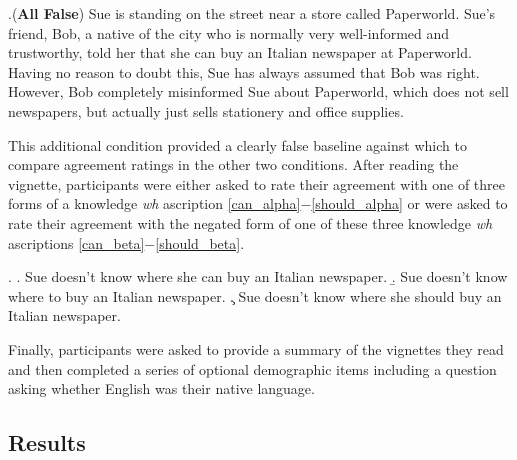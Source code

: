 \documentclass[a4paper]{article}
\begin{document}
\ex.\label{bobreallywrong}(\textbf{All False}) Sue is standing on the street near a store called Paperworld. Sue's friend, Bob, a native of the city who is normally very well-informed and trustworthy, told her that she can buy an Italian newspaper at Paperworld. Having no reason to doubt this, Sue has always assumed that Bob was right. However, Bob completely misinformed Sue about Paperworld, which does not sell newspapers, but actually just sells stationery and office supplies. 

This additional condition provided a clearly false baseline against which to compare agreement ratings in the other two conditions. After reading the vignette, participants were either asked to rate their agreement with one of three forms of a knowledge \textit{wh} ascription \ref{can_alpha}$-$\ref{should_alpha} or were asked to rate their agreement with the negated form of one of these three knowledge \textit{wh} ascriptions \ref{can_beta}$-$\ref{should_beta}.

\ex. \a. \label{can_beta} Sue doesn't know where she can buy an Italian newspaper.
\b. \label{to_beta} Sue doesn't know where to buy an Italian newspaper.
\c. \label{should_beta} Sue doesn't know where she should buy an Italian newspaper.

Finally, participants were asked to provide a summary of the vignettes they read and then completed a series of optional demographic items including a question asking whether English was their native language. 

\subsection{Results}
\end{document}
